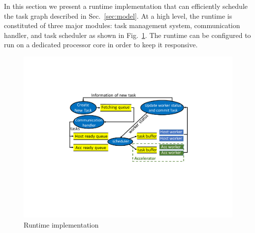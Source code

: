 In this section we present a runtime implementation that can efficiently schedule the task graph described in Sec.~\ref{sec:model}.
At a high level, the runtime is constituted of three major modules: task management system, communication handler, and task scheduler as shown in Fig.~\ref{fig:impl}. 
The runtime can be configured to run on a dedicated processor core in order to keep it responsive.

\begin{figure}[htb]
\centering
\includegraphics[width=.49\textwidth]{figures/impl.pdf}
\caption{Runtime implementation}
\label{fig:impl}
\end{figure}


